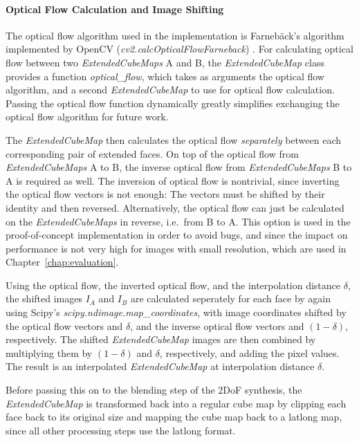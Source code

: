\paragraph{Optical Flow Calculation and Image Shifting}
The optical flow algorithm used in the implementation is Farneb\"ack's algorithm implemented by OpenCV (\emph{cv2.calcOpticalFlowFarneback}) \cite{opencv}. For calculating optical flow between two \emph{ExtendedCubeMaps} A and B, the \emph{ExtendedCubeMap} class provides a function \emph{optical\_flow}, which takes as arguments the optical flow algorithm, and a second \emph{ExtendedCubeMap} to use for optical flow calculation. Passing the optical flow function dynamically greatly simplifies exchanging the optical flow algorithm for future work.

The \emph{ExtendedCubeMap} then calculates the optical flow \emph{separately} between each corresponding pair of extended faces. On top of the optical flow from \emph{ExtendedCubeMaps} A to B, the inverse optical flow from \emph{ExtendedCubeMaps} B to A is required as well. The inversion of optical flow is nontrivial, since inverting the optical flow vectors is not enough: The vectors must be shifted by their identity and then reversed. Alternatively, the optical flow can just be calculated on the \emph{ExtendedCubeMaps} in reverse, i.e.\ from B to A. This option is used in the proof-of-concept implementation in order to avoid bugs, and since the impact on performance is not very high for images with small resolution, which are used in Chapter~\ref{chap:evaluation}.

Using the optical flow, the inverted optical flow, and the interpolation distance $\delta$, the shifted images $I_A$ and $I_B$ are calculated seperately for each face by again using Scipy's \emph{scipy.ndimage.map\_coordinates}, with image coordinates shifted by the optical flow vectors and $\delta$, and the inverse optical flow vectors and $(1-\delta)$, respectively. The shifted \emph{ExtendedCubeMap} images are then combined by multiplying them by $(1-\delta)$ and $\delta$, respectively, and adding the pixel values. The result is an interpolated \emph{ExtendedCubeMap} at interpolation distance $\delta$.

Before passing this on to the blending step of the 2DoF synthesis, the \emph{ExtendedCubeMap} is transformed back into a regular cube map by clipping each face back to its original size and mapping the cube map back to a latlong map, since all other processing steps use the latlong format.

